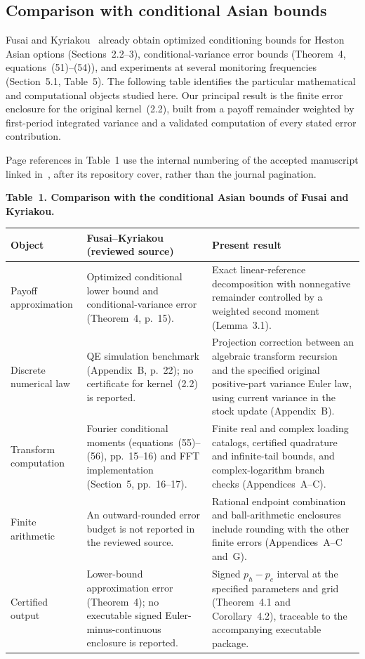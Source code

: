 \documentclass[11pt,a4paper]{article}
\begin{document}
\subsection{Comparison with conditional Asian bounds}


Fusai and Kyriakou~\cite{FusaiKyriakou2016} already obtain optimized
conditioning bounds for Heston Asian options (Sections~2.2--3),
conditional-variance error bounds (Theorem~4, equations~(51)--(54)), and
experiments at several monitoring frequencies (Section~5.1, Table~5).
The following table identifies the particular mathematical
and computational objects studied here. Our principal result is
the finite error enclosure for the original kernel~(2.2), built from a
payoff remainder weighted by first-period integrated variance and a
validated computation of every stated error contribution.





Page references in Table~1 use the internal numbering of the accepted manuscript linked in~\cite{FusaiKyriakou2016}, after its repository cover, rather than the journal pagination.

\noindent\textbf{Table~1. Comparison with the conditional Asian bounds of Fusai and Kyriakou.}
\begin{tabularx}{\textwidth}{@{}p{}XX@{}}
\toprule
Object & Fusai--Kyriakou (reviewed source) & Present result \\
\midrule
Payoff approximation &
Optimized conditional lower bound and conditional-variance error
(Theorem~4, p.~15). &
Exact linear-reference decomposition with nonnegative remainder
controlled by a weighted second moment
(Lemma~3.1). \\
\addlinespace
Discrete numerical law &
QE simulation benchmark (Appendix~B, p.~22); no certificate for
kernel~(2.2) is reported. &
Projection correction between an algebraic transform recursion and the
specified original positive-part variance Euler law, using current
variance in the stock update (Appendix~B). \\
\addlinespace
Transform computation &
Fourier conditional moments (equations~(55)--(56), pp.~15--16) and FFT
implementation (Section~5, pp.~16--17). &
Finite real and complex loading catalogs, certified quadrature and
infinite-tail bounds, and complex-logarithm branch checks
(Appendices~A--C). \\
\addlinespace
Finite arithmetic &
An outward-rounded error budget is not reported in the reviewed source. &
Rational endpoint combination and ball-arithmetic enclosures include
rounding with the other finite errors (Appendices~A--C and~G). \\
\addlinespace
Certified output &
Lower-bound approximation error (Theorem~4); no executable signed
Euler-minus-continuous enclosure is reported. &
Signed \(p_h-p_c\) interval at the specified parameters and grid
(Theorem~4.1 and Corollary~4.2), traceable to the accompanying executable
package. \\
\bottomrule
\end{tabularx}
\end{document}
